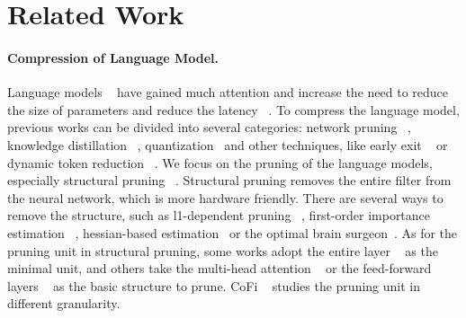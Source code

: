 \documentclass{article}
\newcommand{\xw}[1]{\textcolor{blue}{#1}}
\newcommand{\xwc}[1]{\textcolor{red}{[xw: #1]}}
\begin{document}

\section{Related Work}
\paragraph{Compression of Language Model.}
Language models ~\cite{devlin2018bert,liu2019roberta,lewis2019bart} have gained much attention and increase the need to reduce the size of parameters and reduce the latency ~\cite{lanalbert,sun2020mobilebert}. To compress the language model, previous works can be divided into several categories: network pruning ~\cite{kurtic2022optimal,xu2021rethinking,liu2021ebert,ProximalPruning}, knowledge distillation ~\cite{sun2019patient,sun-etal-2020-contrastive,metakd}, quantization~\cite{yao2022zeroquant,bai2020binarybert,zafrir2019q8bert} and other techniques, like early exit ~\cite{xin-etal-2020-deebert} or dynamic token reduction ~\cite{ye-etal-2021-tr}. We focus on the pruning  of the language models, especially structural pruning ~\cite{li2016pruning}. Structural pruning removes the entire filter from the neural network, which is more hardware friendly. There are several ways to remove the structure, such as l1-dependent pruning ~\cite{NIPS2015_pruning,zafrir2021prune}, first-order importance estimation ~\cite{hou2020dynabert}, hessian-based estimation~\cite{kurtic2022optimal,wang2019eigendamage} or the optimal brain surgeon~\cite{lecun1989optimal,kurtic2022optimal}. As for the pruning unit in structural pruning, some works adopt the entire layer ~\cite{fan2019reducing} as the minimal unit, and others take the multi-head attention ~\cite{voita2019analyzing} or the feed-forward layers ~\cite{hou2020dynabert,mccarley2019structured} as the basic structure to prune. CoFi ~\cite{xia2022structured} studies the pruning unit in different granularity. 
\end{document}
